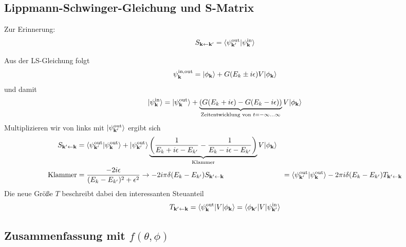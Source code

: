 \documentclass[11pt,a4paper]{report}
\begin{document}
\subsection{Lippmann-Schwinger-Gleichung und S-Matrix}

Zur Erinnerung:
\begin{align*}
    S_{\mathbf{k} \leftarrow \mathbf{k}'} = \langle \psi_{\mathbf{k}'}^{\text{out}}|\psi_{\mathbf{k}}^{\text{in}}\rangle
\end{align*}

Aus der LS-Gleichung folgt 
\begin{align*}
    \psi_{\mathbf{k}}^{\text{in,out}} = |\phi_{\mathbf{k}}\rangle + G(E_k \pm i\epsilon) V |\phi_{\mathbf{k}}\rangle 
\end{align*}
und damit
\begin{align*}
    |\psi_{\mathbf{k}}^{\text{in}}\rangle = |\psi_{\mathbf{k}}^{\text{out}}\rangle + \underbrace{(G(E_k + i \epsilon) - G(E_k - i \epsilon))}_{\text{Zeitentwicklung von }t=-\infty\ldots\infty} V |\phi_{\mathbf{k}}\rangle
\end{align*}
Multiplizieren wir von links mit $|\psi_{\mathbf{k}'}^{\text{out}}\rangle$ ergibt sich
\begin{align*}
    S_{\mathbf{k}' \leftarrow \mathbf{k}} &= \langle \psi_{\mathbf{k}'}^{\text{out}}|\psi_{\mathbf{k}}^{\text{out}}\rangle + |\psi_{\mathbf{k}'}^{\text{out}}\rangle \underbrace{\left( \frac{1}{E_k + i \epsilon - E_{k'}} - \frac{1}{E_k - i\epsilon - E_{k'}} \right)}_{\text{Klammer}} V |\phi_{\mathbf{k}}\rangle \\
    \text{Klammer} &= \frac{-2 i \epsilon}{(E_k - E_{k'})^2 + \epsilon^2} \rightarrow -2 i \pi \delta(E_k - E_{k'})
    S_{\mathbf{k}' \leftarrow \mathbf{k}} &= \langle \psi_{\mathbf{k}'}^{\text{out}}|\psi_{\mathbf{k}}^{\text{out}}\rangle - 2 \pi i \delta(E_k - E_{k'}) T_{\mathbf{k}' \leftarrow \mathbf{k}}
\end{align*}
Die neue Größe $T$ beschreibt dabei den interessanten Steuanteil
\begin{align*}
    T_{\mathbf{k}' \leftarrow \mathbf{k}} = \langle \psi_{\mathbf{k}}^{\text{out}}|V|\phi_{\mathbf{k}}\rangle = \langle \phi_{\mathbf{k}'}|V|\psi_{\mathbf{k}'}^{\text{in}}\rangle
\end{align*}

\subsection[Zusammenfassung mit $f(\theta, \phi)$]{Zusammenfassung mit $f(\theta, \phi)$}
\end{document}
